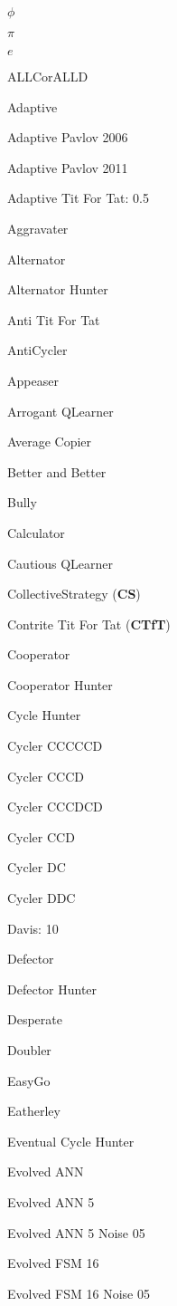 \item $\phi$
\item $\pi$
\item $e$
\item ALLCorALLD
\item Adaptive
\item Adaptive Pavlov 2006
\item Adaptive Pavlov 2011
\item Adaptive Tit For Tat: 0.5
\item Aggravater
\item Alternator
\item Alternator Hunter
\item Anti Tit For Tat
\item AntiCycler
\item Appeaser
\item Arrogant QLearner
\item Average Copier
\item Better and Better
\item Bully
\item Calculator
\item Cautious QLearner
\item CollectiveStrategy
(\textbf{CS})\item Contrite Tit For Tat
(\textbf{CTfT})\item Cooperator
\item Cooperator Hunter
\item Cycle Hunter
\item Cycler CCCCCD
\item Cycler CCCD
\item Cycler CCCDCD
\item Cycler CCD
\item Cycler DC
\item Cycler DDC
\item Davis: 10
\item Defector
\item Defector Hunter
\item Desperate
\item Doubler
\item EasyGo
\item Eatherley
\item Eventual Cycle Hunter
\item Evolved ANN
\item Evolved ANN 5
\item Evolved ANN 5 Noise 05
\item Evolved FSM 16
\item Evolved FSM 16 Noise 05
